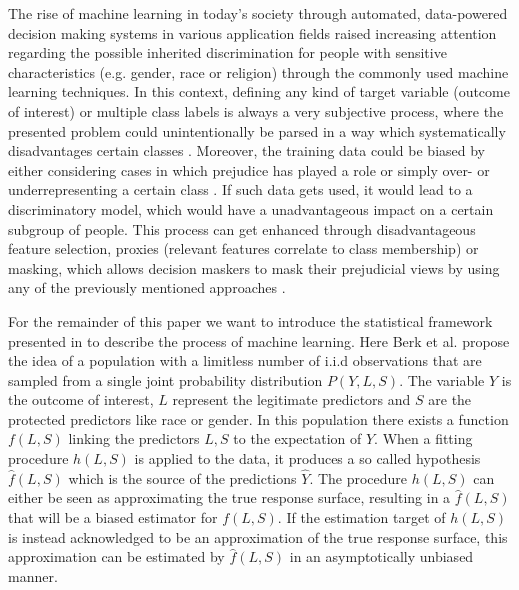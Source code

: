 The rise of machine learning in today's society through automated, data-powered decision making systems in various application fields raised increasing attention regarding the possible inherited discrimination for people with sensitive characteristics (e.g. gender, race or religion) through the commonly used machine learning techniques.
In this context, defining any kind of target variable (outcome of interest) or multiple class labels is always a very subjective process, where 
the presented problem could unintentionally be parsed in a way which systematically disadvantages 
certain classes \cite{Barocas.2016, barocas-hardt-narayanan}. Moreover, the training data could be biased by 
either considering cases in which prejudice has played a role or simply over- or underrepresenting 
a certain class \cite{Barocas.2016, barocas-hardt-narayanan}. If such data gets used, it would lead to a discriminatory model, which would have a unadvantageous impact on a certain subgroup of people. This process can get enhanced through disadvantageous feature selection, proxies (relevant features correlate to class membership) or masking, which allows decision maskers to mask their prejudicial views by using any of the previously mentioned approaches \cite{Barocas.2016, barocas-hardt-narayanan}.  

For the remainder of this paper we want to introduce the statistical framework presented in \cite{Berk.2018} to describe the process of machine learning. Here Berk et al. propose the idea of a population with a limitless number of i.i.d observations that are sampled from a single joint probability distribution $P(Y,L,S)$. 
The variable $Y$ is the outcome of interest, $L$ represent the legitimate predictors and $S$ are the 
protected predictors like race or gender. In this population there exists a function $f(L,S)$ 
linking the predictors $L,S$ to the expectation of $Y$. When a fitting procedure $h(L,S)$ 
is applied to the data, it produces a so called hypothesis $\hat{f}(L,S)$ which is the 
source of the predictions $\hat{Y}$. The procedure $h(L,S)$ can either be seen as 
approximating the true response surface, resulting in a $\hat{f}(L,S)$ that will be a biased 
estimator for $f(L,S)$. If the estimation target of $h(L,S)$ is instead acknowledged to be 
an approximation of the true response surface, this approximation can be estimated by 
$\hat{f}(L,S)$ in an asymptotically unbiased manner.
